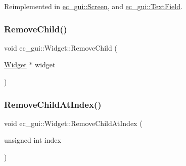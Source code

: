 Reimplemented in \mbox{\hyperlink{classec__gui_1_1_screen_ac2f9e1f91cc01bbe22d3b8c9c19659b6}{ec\+\_\+gui\+::\+Screen}}, and \mbox{\hyperlink{classec__gui_1_1_text_field_a62a9512be0b6d2bf6b79f6e4aeadc9b3}{ec\+\_\+gui\+::\+Text\+Field}}.

\mbox{\label{classec__gui_1_1_widget_a9e880c3e024f6a2a294bb1afe4458de0}} 
\subsubsection{\texorpdfstring{Remove\+Child()}{RemoveChild()}}
{\footnotesize\ttfamily void ec\+\_\+gui\+::\+Widget\+::\+Remove\+Child (\begin{DoxyParamCaption}\item[{\mbox{\hyperlink{classec__gui_1_1_widget}{Widget}} $\ast$}]{widget }\end{DoxyParamCaption})\hspace{0.3cm}{\ttfamily [virtual]}}

\mbox{\label{classec__gui_1_1_widget_af4ecf9e3bd7e672a582d574324b28a76}} 
\subsubsection{\texorpdfstring{Remove\+Child\+At\+Index()}{RemoveChildAtIndex()}}
{\footnotesize\ttfamily void ec\+\_\+gui\+::\+Widget\+::\+Remove\+Child\+At\+Index (\begin{DoxyParamCaption}\item[{unsigned int}]{index }\end{DoxyParamCaption})\hspace{0.3cm}{\ttfamily [virtual]}}

\mbox{\label{classec__gui_1_1_widget_a5a8b9275293ea433e6ba8fec3e7b5232}} 
